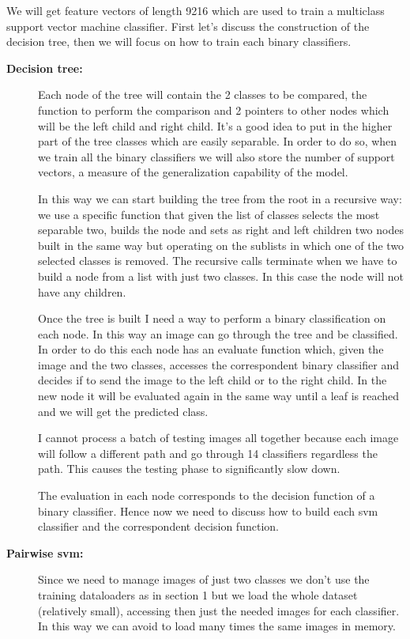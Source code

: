 \documentclass[12pt, a4paper]{report}
\begin{document}
We will get feature vectors of length 9216 which are used to train a multiclass support vector machine classifier. 	
First let's discuss the construction of the decision tree, then we will focus on how to train each binary classifiers.

\begin{description}
	\item[\textbf{Decision tree:}] 
	Each node of the tree will contain the 2 classes to be compared, the function to perform the comparison and 2 pointers to other nodes which will be the left child and right child.
	It's a good idea to put in the higher part of the tree classes which are easily separable. In order to do so, when we train all the binary classifiers we will also store the number of support vectors, a measure of the generalization capability of the model.
	
	In this way we can start building the tree from the root in a recursive way: we use a specific function that given the list of classes selects the most separable two, builds the node and sets as right and left children two nodes built in the same way but operating on the sublists in which one of the two selected classes is removed.
	The recursive calls terminate when we have to build a node from a list with just two classes. In this case the node will not have any children.
	
	Once the tree is built I need a way to perform a binary classification on each node. In this way an image can go through the tree and be classified.
	In order to do this each node has an evaluate function which, given the image and the two classes, accesses the correspondent binary classifier and decides if to send the image to the left child or to the right child. In the new node it will be evaluated again in the same way until a leaf is reached and we will get the predicted class. 
	
	I cannot process a batch of testing images all together because each image will follow a different path and go through 14 classifiers regardless the path.
	This causes the testing phase to significantly slow down.
	
	The evaluation in each node corresponds to the decision function of a binary classifier. Hence now we need to discuss how to build each svm classifier and the correspondent decision function.
	
	
	\item[\textbf{Pairwise svm:}] Since we need to manage images of just two classes we don't use the training dataloaders as in section 1 but we load the whole dataset (relatively small), accessing then just the needed images for each classifier. In this way we can avoid to load many times the same images in memory.
	

\end{description}
\end{document}
